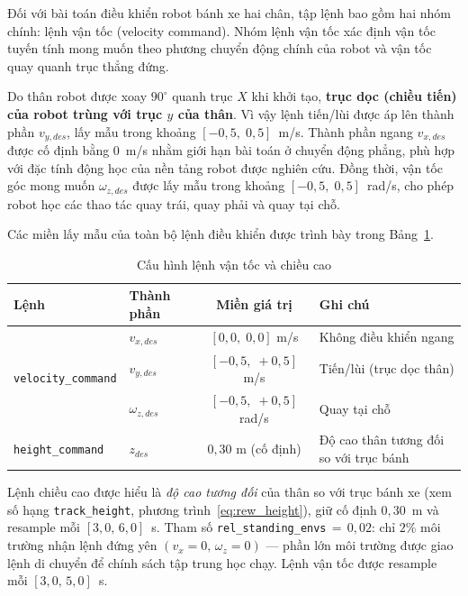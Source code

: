 Đối với bài toán điều khiển robot bánh xe hai chân, tập lệnh bao gồm hai nhóm chính: lệnh vận tốc (velocity command). Nhóm lệnh vận tốc xác định vận tốc tuyến tính mong muốn theo phương chuyển động chính của robot và vận tốc quay quanh trục thẳng đứng. 

Do thân robot được xoay $90^\circ$ quanh trục $X$ khi khởi tạo, \textbf{trục
dọc (chiều tiến) của robot trùng với trục $y$ của thân}. Vì vậy lệnh tiến/lùi
được áp lên thành phần $v_{y,des}$, lấy mẫu trong khoảng $[-0{,}5,\;0{,}5]$~m/s.
Thành phần ngang $v_{x,des}$ được cố định bằng 0~m/s nhằm giới hạn bài toán ở
chuyển động phẳng, phù hợp với đặc tính động học của nền tảng robot được nghiên
cứu. Đồng thời, vận tốc góc mong muốn $\omega_{z,des}$ được lấy mẫu trong
khoảng $[-0{,}5,\;0{,}5]$~rad/s, cho phép robot học các thao tác quay trái,
quay phải và quay tại chỗ.

Các miền lấy mẫu của toàn bộ lệnh điều khiển được trình bày trong Bảng~\ref{tab:commands}.

\begin{table}[H]
    \centering
    \caption{Cấu hình lệnh vận tốc và chiều cao}
    \label{tab:commands}
    \renewcommand{\arraystretch}{1.3}
    \begin{tabular}{|l|l|c|l|}
    \hline
    \textbf{Lệnh} & \textbf{Thành phần} & \textbf{Miền giá trị} & \textbf{Ghi chú} \\
    \hline
    \multirow{3}{*}{\texttt{velocity\_command}} &
        $v_{x,des}$ & $[0{,}0,\;0{,}0]$ m/s  & Không điều khiển ngang \\
    & $v_{y,des}$ & $[-0{,}5,\;+0{,}5]$ m/s & Tiến/lùi (trục dọc thân) \\
    & $\omega_{z,des}$ & $[-0{,}5,\;+0{,}5]$ rad/s & Quay tại chỗ \\
    \hline
    \texttt{height\_command} & $z_{des}$ & $0{,}30$ m (cố định) & Độ cao thân tương đối so với trục bánh \\
    \hline
    \end{tabular}
\end{table}

Lệnh chiều cao được hiểu là \emph{độ cao tương đối} của thân so với trục
bánh xe (xem số hạng \texttt{track\_height},
phương trình~\eqref{eq:rew_height}), giữ cố định $0{,}30$~m và resample mỗi
$[3{,}0,\,6{,}0]$~s. Tham số \texttt{rel\_standing\_envs}$\,{=}\,0{,}02$:
chỉ $2\%$ môi trường nhận lệnh đứng yên $(v_x{=}0,\,\omega_z{=}0)$ — phần
lớn môi trường được giao lệnh di chuyển để chính sách tập trung học chạy.
Lệnh vận tốc được resample mỗi $[3{,}0,\,5{,}0]$~s.

